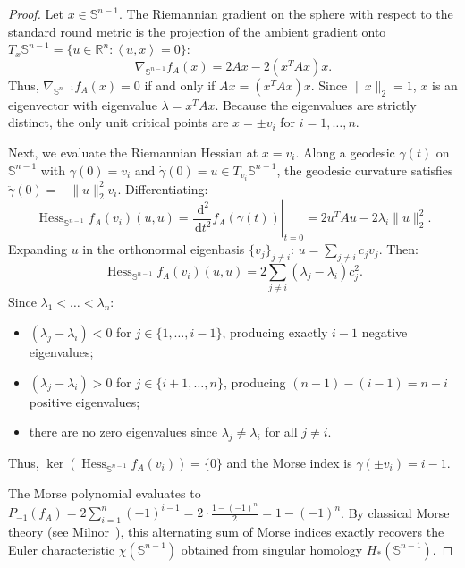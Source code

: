 \documentclass[11pt,a4paper,reqno]{amsart}
\theoremstyle{definition}
\numberwithin{equation}{section}
\providecommand{\R}{\mathbb{R}}
\providecommand{\Sph}{\mathbb{S}}
\newcommand{\inner}[2]{\left\langle #1, #2 \right\rangle}
\newcommand{\dif}{\,\mathrm{d}}
\begin{document}
\begin{proof}
Let $x \in \Sph^{n-1}$. The Riemannian gradient on the sphere with respect to the standard round metric is the projection of the ambient gradient onto $T_x \Sph^{n-1} = \{u \in \R^n \colon \inner{u}{x} = 0\}$:
\begin{equation}
    \nabla_{\Sph^{n-1}} f_A(x) = 2 A x - 2(x^T A x) x.
\end{equation}
Thus, $\nabla_{\Sph^{n-1}} f_A(x) = 0$ if and only if $Ax = (x^T Ax) x$. Since $\|x\|_2=1$, $x$ is an eigenvector with eigenvalue $\lambda = x^T Ax$. Because the eigenvalues are strictly distinct, the only unit critical points are $x = \pm v_i$ for $i=1, \dots, n$.

Next, we evaluate the Riemannian Hessian at $x = v_i$. Along a geodesic $\gamma(t)$ on $\Sph^{n-1}$ with $\gamma(0) = v_i$ and $\dot{\gamma}(0) = u \in T_{v_i} \Sph^{n-1}$, the geodesic curvature satisfies $\ddot{\gamma}(0) = -\|u\|_2^2 v_i$. Differentiating:
\begin{equation}
    \operatorname{Hess}_{\Sph^{n-1}} f_A(v_i)(u, u) = \left.\frac{\dif^2}{\dif t^2} f_A(\gamma(t))\right|_{t=0} = 2 u^T A u - 2 \lambda_i \|u\|_2^2.
\end{equation}
Expanding $u$ in the orthonormal eigenbasis $\{v_j\}_{j \neq i}$: $u = \sum_{j \ne i} c_j v_j$. Then:
\begin{equation}
    \operatorname{Hess}_{\Sph^{n-1}} f_A(v_i)(u, u) = 2 \sum_{j \ne i} (\lambda_j - \lambda_i) c_j^2.
\end{equation}
Since $\lambda_1 < \dots < \lambda_n$:
\begin{itemize}
    \item $(\lambda_j - \lambda_i) < 0$ for $j \in \{1, \dots, i-1\}$, producing exactly $i-1$ negative eigenvalues;
    \item $(\lambda_j - \lambda_i) > 0$ for $j \in \{i+1, \dots, n\}$, producing $(n-1) - (i-1) = n - i$ positive eigenvalues;
    \item there are no zero eigenvalues since $\lambda_j \ne \lambda_i$ for all $j \ne i$.
\end{itemize}
Thus, $\ker(\operatorname{Hess}_{\Sph^{n-1}} f_A(v_i)) = \{0\}$ and the Morse index is $\gamma(\pm v_i) = i - 1$. 

The Morse polynomial evaluates to $P_{-1}(f_A) = 2 \sum_{i=1}^n (-1)^{i-1} = 2 \cdot \frac{1 - (-1)^n}{2} = 1 - (-1)^n$. By classical Morse theory (see Milnor~\cite{milnor1963morse}), this alternating sum of Morse indices exactly recovers the Euler characteristic $\chi(\Sph^{n-1})$ obtained from singular homology $H_*(\Sph^{n-1})$.
\end{proof}
\end{document}
